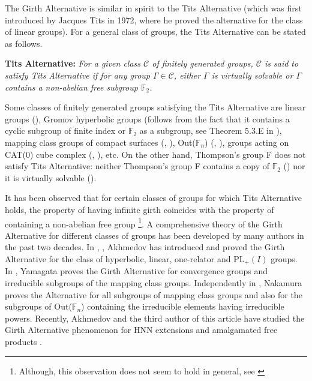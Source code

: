 \documentclass{amsart}
\theoremstyle{definition}
\newtheorem*{Notation warning}{Warning on notations}
\newtheorem*{Sketch of proof}{Sketch of proof for Theorem C}
\begin{document}
\begin{sloppypar}
The Girth Alternative is similar in spirit to the Tits Alternative (which was first introduced by Jacques Tits in 1972, where he proved the alternative for the class of linear groups). For a general class of groups, the Tits Alternative can be stated as follows.
\medskip

\noindent
\textbf{Tits Alternative:} \label{thm:TA}\textit{For a given class $\mathcal{C}$ of finitely generated groups, $\mathcal{C}$ is said to satisfy Tits Alternative if for any group $\Gamma \in \mathcal{C}$, either $\Gamma$ is virtually solvable or $\Gamma$ contains a non-abelian free subgroup $\mathbb{F}_2$.}
\medskip

Some classes of finitely generated groups satisfying the Tits Alternative are linear groups (\cite{Tits1972FreeSI}), Gromov hyperbolic groups (follows from the fact that it contains a cyclic subgroup of finite index or $\mathbb{F}_2$ as a subgroup, see Theorem 5.3.E in \cite{Gro87}), mapping class groups of compact surfaces (\cite{MR0745513}, \cite{10.1215/S0012-7094-83-05046-9}), Out($\mathbb{F}_n$) (\cite{Bestvina1997TheTA}, \cite{Bestvina1997TheTA2}), groups acting on CAT(0) cube complex (\cite {sageev_wise_2005}, \cite{Caprace_2011}), etc. On the other hand, Thompson's group F does not satisfy Tits Alternative: neither Thompson's group F contains a copy of $\mathbb{F}_2$ (\cite{MR0782231}) nor it is virtually solvable (\cite{MR2707536}).
 
\medskip

It has been observed that for certain classes of groups for which Tits Alternative holds, the property of having infinite girth coincides with the property of containing a non-abelian free group \footnote{Although, this observation does not seem to hold in general, see \cite{akhmedov2014girth}}.
A comprehensive theory of the Girth Alternative for different classes of groups has been developed by many authors in the past two decades. 
In \cite{AKHMEDOV2003198}, \cite{akhmedov2005girth}, Akhmedov has introduced and proved the Girth Alternative for the class of hyperbolic, linear,
one-relator and $\mbox{PL}_+(I)$ groups. In \cite{yamagata}, Yamagata proves the Girth Alternative for convergence groups and irreducible subgroups of the mapping class groups. Independently in \cite{nakamura2011girth},
Nakamura proves the Alternative for all subgroups of mapping class groups and also for the
subgroups of Out($\mathbb{F}_n$) containing the irreducible elements having irreducible powers. Recently, Akhmedov and the third author of this article have studied the Girth Alternative phenomenon for HNN extensions and amalgamated free products \cite{AkhmedovMishra2023}.
\medskip


\end{sloppypar}
\end{document}
